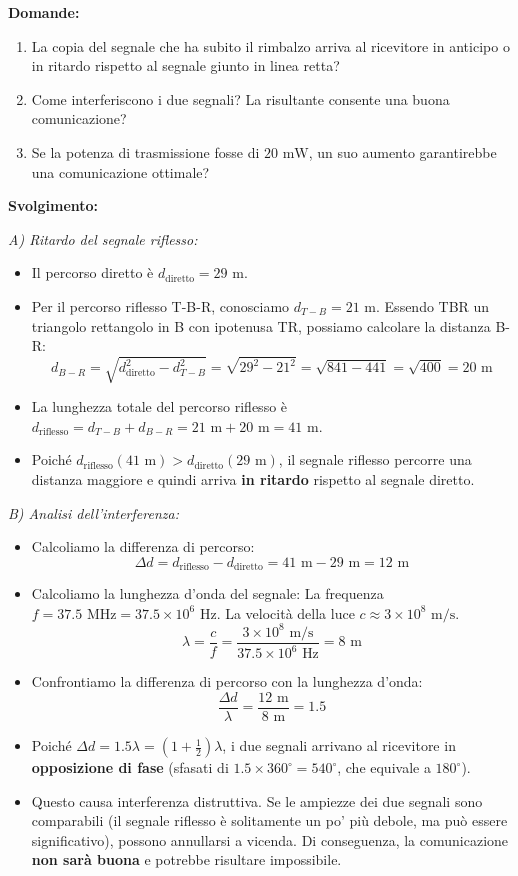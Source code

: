 \textbf{Domande:}
\begin{enumerate}[label=\Alph*)]
    \item La copia del segnale che ha subito il rimbalzo arriva al ricevitore in anticipo o in ritardo rispetto al segnale giunto in linea retta?
    \item Come interferiscono i due segnali? La risultante consente una buona comunicazione?
    \item Se la potenza di trasmissione fosse di $20 \text{ mW}$, un suo aumento garantirebbe una comunicazione ottimale?
\end{enumerate}

\textbf{Svolgimento:}

\textit{A) Ritardo del segnale riflesso:}
\begin{itemize}
    \item Il percorso diretto è $d_{\text{diretto}} = 29 \text{ m}$.
    \item Per il percorso riflesso T-B-R, conosciamo $d_{T-B} = 21 \text{ m}$. Essendo TBR un triangolo rettangolo in B con ipotenusa TR, possiamo calcolare la distanza B-R:
    \[ d_{B-R} = \sqrt{d_{\text{diretto}}^2 - d_{T-B}^2} = \sqrt{29^2 - 21^2} = \sqrt{841 - 441} = \sqrt{400} = 20 \text{ m} \]
    \item La lunghezza totale del percorso riflesso è $d_{\text{riflesso}} = d_{T-B} + d_{B-R} = 21 \text{ m} + 20 \text{ m} = 41 \text{ m}$.
    \item Poiché $d_{\text{riflesso}} (41 \text{ m}) > d_{\text{diretto}} (29 \text{ m})$, il segnale riflesso percorre una distanza maggiore e quindi arriva \textbf{in ritardo} rispetto al segnale diretto.
\end{itemize}

\textit{B) Analisi dell'interferenza:}
\begin{itemize}
    \item Calcoliamo la differenza di percorso:
    \[ \Delta d = d_{\text{riflesso}} - d_{\text{diretto}} = 41 \text{ m} - 29 \text{ m} = 12 \text{ m} \]
    \item Calcoliamo la lunghezza d'onda del segnale:
    La frequenza $f = 37.5 \text{ MHz} = 37.5 \times 10^6 \text{ Hz}$. La velocità della luce $c \approx 3 \times 10^8 \text{ m/s}$.
    \[ \lambda = \frac{c}{f} = \frac{3 \times 10^8 \text{ m/s}}{37.5 \times 10^6 \text{ Hz}} = 8 \text{ m} \]
    \item Confrontiamo la differenza di percorso con la lunghezza d'onda:
    \[ \frac{\Delta d}{\lambda} = \frac{12 \text{ m}}{8 \text{ m}} = 1.5 \]
    \item Poiché $\Delta d = 1.5 \lambda = (1 + \frac{1}{2})\lambda$, i due segnali arrivano al ricevitore in \textbf{opposizione di fase} (sfasati di $1.5 \times 360^\circ = 540^\circ$, che equivale a $180^\circ$).
    \item Questo causa interferenza distruttiva. Se le ampiezze dei due segnali sono comparabili (il segnale riflesso è solitamente un po' più debole, ma può essere significativo), possono annullarsi a vicenda. Di conseguenza, la comunicazione \textbf{non sarà buona} e potrebbe risultare impossibile.
\end{itemize}

